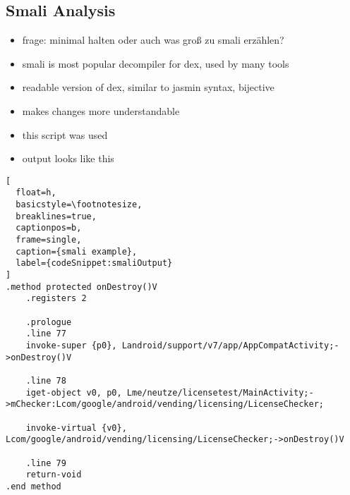 \subsection{Smali Analysis} \label{subsection:tools-baksmali}
\begin{itemize}
  \item frage: minimal halten oder auch was groß zu smali erzählen?
    \item smali is most popular decompiler for dex, used by many tools
    \item readable version of dex, similar to jasmin syntax, bijective
    \item makes changes more understandable
    \item this script was used
    \item output looks like this
\end{itemize}



\begin{lstlisting}[
  float=h,
  basicstyle=\footnotesize,
  breaklines=true,
  captionpos=b,
  frame=single,
  caption={smali example},
  label={codeSnippet:smaliOutput}
]
.method protected onDestroy()V
    .registers 2

    .prologue
    .line 77
    invoke-super {p0}, Landroid/support/v7/app/AppCompatActivity;->onDestroy()V

    .line 78
    iget-object v0, p0, Lme/neutze/licensetest/MainActivity;->mChecker:Lcom/google/android/vending/licensing/LicenseChecker;

    invoke-virtual {v0}, Lcom/google/android/vending/licensing/LicenseChecker;->onDestroy()V

    .line 79
    return-void
.end method
\end{lstlisting}
